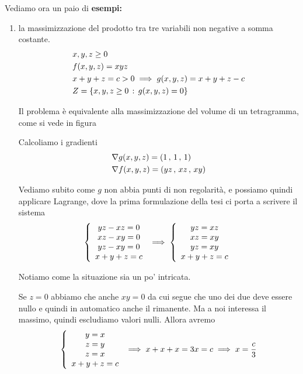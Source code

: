 \newpage

Vediamo ora un paio di \textbf{esempi:} 

\begin{enumerate}
	\item la massimizzazione del prodotto tra tre variabili non negative a somma costante.
	\begin{align}
		{}&x,y,z\geq 0\\
		&f(x,y,z)=xyz \\
		&x+y+z=c>0 \implies g(x,y,z)=x+y+z-c\\
		&Z=\{ x,y,z \geq 0 \, : \, g(x,y,z)=0 \}
	\end{align}
	
	Il problema è equivalente alla massimizzazione del volume di un tetragramma, come si vede in figura
	
	\begin{figure}[!htb]
	\end{figure}	
	
	Calcoliamo i gradienti
	\begin{align}
		{}&\nabla g(x,y,z)= (1 \, , \, 1 \, , \, 1) \\
		&\nabla f(x,y,z)=(yz \, , \, xz \, , \, xy)
	\end{align}
	
	Vediamo subito come $g$ non abbia punti di non regolarità, e possiamo quindi applicare Lagrange, dove la prima formulazione della tesi ci porta a scrivere il sistema
	\begin{align}
		\left\{\begin{array}{cc} yz-xz=0 \\ xz-xy=0 \\ yz-xy=0 \\ x+y+z=c \end{array}\right. \implies \left\{\begin{array}{cc} yz=xz \\ xz=xy \\ yz=xy \\ x+y+z=c \end{array}\right.
	\end{align}
	
	Notiamo come la situazione sia un po' intricata.
	
	Se $z=0$ abbiamo che anche $xy=0$ da cui segue che uno dei due deve essere nullo e quindi in automatico anche il rimanente. Ma a noi interessa il massimo, quindi escludiamo valori nulli. Allora avremo
	\begin{align}
		\left\{\begin{array}{cc} y=x \\ z=y \\ z=x \\ x+y+z=c \end{array}\right. \implies x+x+x=3x=c \implies x= \frac{c}{3}
	\end{align}
	

\end{enumerate}
